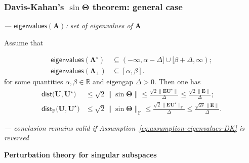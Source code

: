 \documentclass[compress,
mathserif,wide,%
]{beamer}
\begin{document}
\begin{frame}
	\frametitle{Davis-Kahan's $\sin\bm{\Theta}$ theorem: general case}
	\vspace{-0.5em}
	{\hfill \footnotesize \em --- $\mathsf{eigenvalues}(\bm{A})$: set of eigenvalues of $\bm{A}$}
	\begin{theorem}
\label{thm:davis-kahan}Assume that

\vspace{-2em}
\begin{subequations}
\label{eq:assumption-eigenvalues-DK}
\begin{align}
	\mathsf{eigenvalues}(\bm{\Lambda}^{\star}) &\subseteq (-\infty, \alpha-\Delta] \cup [\beta+\Delta, \infty) ; \\
	\mathsf{eigenvalues}(\bm{\Lambda}_{\perp}) &\subseteq [\alpha,\beta].
\end{align}
\end{subequations}
%
for some quantities $\alpha,\beta\in \mathbb{R}$ and eigengap $\Delta>0$. Then one has
\begin{subequations}
\begin{align*}
\mathsf{dist}\big(\bm{U},\bm{U}^{\star}\big) & \leq\sqrt{2}\|\sin\bm{\Theta}\|\leq\frac{\sqrt{2}\big\|\bm{E}\bm{U}^{\star}\big\|}{\Delta}\leq\frac{\sqrt{2}\|\bm{E}\|}{\Delta};\\
\mathsf{dist}_{\mathrm{F}}\big(\bm{U},\bm{U}^{\star}\big) & \leq\sqrt{2}\|\sin\bm{\Theta}\|_{\mathrm{F}}\leq\frac{\sqrt{2}\big\|\bm{E}\bm{U}^{\star}\big\|_{\mathrm{F}}}{\Delta}\leq\frac{\sqrt{2r}\|\bm{E}\|}{\Delta}.
\end{align*}
\end{subequations}
%
\end{theorem}

\hfill \small \em --- conclusion remains valid if Assumption~\eqref{eq:assumption-eigenvalues-DK} is reversed
%

%

\end{frame}



\begin{frame}[plain]

\vfill
\begin{center}
  {\Large\bf Perturbation theory for singular subspaces}
\end{center}
\vfill

\end{frame}
\end{document}
